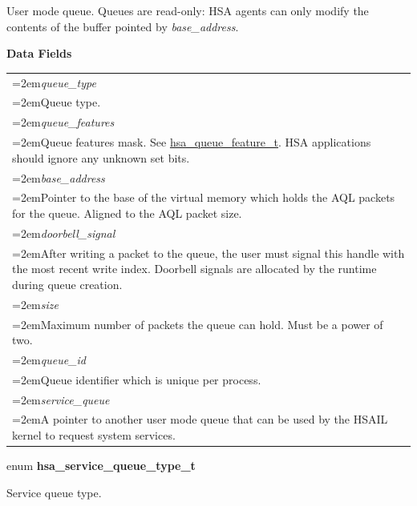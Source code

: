 \documentclass[final]{book}
\newcommand{\reffld}[1]{\textit{#1}}
\begin{document}
\begin{appendices}
\begin{tcolorbox}[breakable,nobeforeafter,arc=0mm,colframe=white,colback=lightgray,left=0mm]
\end{tcolorbox}
User mode queue. Queues are read-only: HSA agents can only modify the contents of the buffer pointed by \textit{base_address}.

\noindent\textbf{Data Fields}\\[-6mm]
\begin{longtable}{@{}>{\hangindent=2em}p{\textwidth}}
\reffld{queue_type}\\\hspace{2em}Queue type.\\[2mm]
\reffld{queue_features}\\\hspace{2em}Queue features mask. See \hyperlink{group--queue-1ga1145b01f6d9e2670179a22c92db39413}{hsa_queue_feature_t}. HSA applications should ignore any unknown set bits.\\[2mm]
\reffld{base_address}\\\hspace{2em}Pointer to the base of the virtual memory which holds the AQL packets for the queue. Aligned to the AQL packet size.\\[2mm]
\reffld{doorbell_signal}\\\hspace{2em}After writing a packet to the queue, the user must signal this handle with the most recent write index. Doorbell signals are allocated by the runtime during queue creation.\\[2mm]
\reffld{size}\\\hspace{2em}Maximum number of packets the queue can hold. Must be a power of two.\\[2mm]
\reffld{queue_id}\\\hspace{2em}Queue identifier which is unique per process.\\[2mm]
\reffld{service_queue}\\\hspace{2em}A pointer to another user mode queue that can be used by the HSAIL kernel to request system services.
\end{longtable}



\noindent\begin{tcolorbox}[nobeforeafter,arc=0mm,colframe=white,colback=lightgray,left=0mm]
enum \hypertarget{group--queue-1ga78cf6075d505c83bc59ed38ee8c39e96}{\textbf{hsa_service_queue_type_t}}
\end{tcolorbox}
Service queue type.


\end{appendices}
\end{document}
